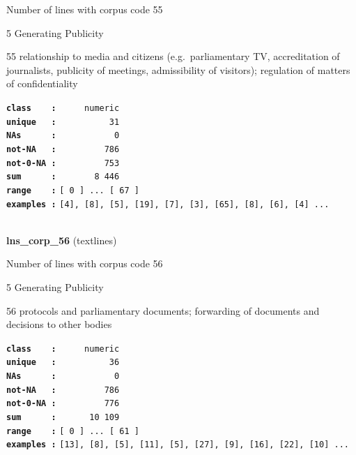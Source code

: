 \documentclass[]{article}
\begin{document}
Number of lines with corpus code 55

5 Generating Publicity

55 relationship to media and citizens (e.g.~parliamentary TV,
accreditation of journalists, publicity of meetings, admissibility of
visitors); regulation of matters of confidentiality

\textbf{\texttt{class\ \ \ \ :}} \texttt{~~~~~numeric}\\
\textbf{\texttt{unique\ \ \ :}} \texttt{~~~~~~~~~~31}\\
\textbf{\texttt{NAs\ \ \ \ \ \ :}} \texttt{~~~~~~~~~~~0}\\
\textbf{\texttt{not-NA\ \ \ :}} \texttt{~~~~~~~~~786}\\
\textbf{\texttt{not-0-NA\ :}} \texttt{~~~~~~~~~753}\\
\textbf{\texttt{sum\ \ \ \ \ \ :}} \texttt{~~~~~~~8~446}\\
\textbf{\texttt{range\ \ \ \ :}}
\texttt{{[}\ 0\ {]}\ ...\ {[}\ 67\ {]}}\\
\textbf{\texttt{examples\ :}}
\texttt{{[}4{]},\ {[}8{]},\ {[}5{]},\ {[}19{]},\ {[}7{]},\ {[}3{]},\ {[}65{]},\ {[}8{]},\ {[}6{]},\ {[}4{]}\ ...}\\

~

\textbf{lns\_corp\_56} (textlines)

Number of lines with corpus code 56

5 Generating Publicity

56 protocols and parliamentary documents; forwarding of documents and
decisions to other bodies

\textbf{\texttt{class\ \ \ \ :}} \texttt{~~~~~numeric}\\
\textbf{\texttt{unique\ \ \ :}} \texttt{~~~~~~~~~~36}\\
\textbf{\texttt{NAs\ \ \ \ \ \ :}} \texttt{~~~~~~~~~~~0}\\
\textbf{\texttt{not-NA\ \ \ :}} \texttt{~~~~~~~~~786}\\
\textbf{\texttt{not-0-NA\ :}} \texttt{~~~~~~~~~776}\\
\textbf{\texttt{sum\ \ \ \ \ \ :}} \texttt{~~~~~~10~109}\\
\textbf{\texttt{range\ \ \ \ :}}
\texttt{{[}\ 0\ {]}\ ...\ {[}\ 61\ {]}}\\
\textbf{\texttt{examples\ :}}
\texttt{{[}13{]},\ {[}8{]},\ {[}5{]},\ {[}11{]},\ {[}5{]},\ {[}27{]},\ {[}9{]},\ {[}16{]},\ {[}22{]},\ {[}10{]}\ ...}\\
\end{document}
